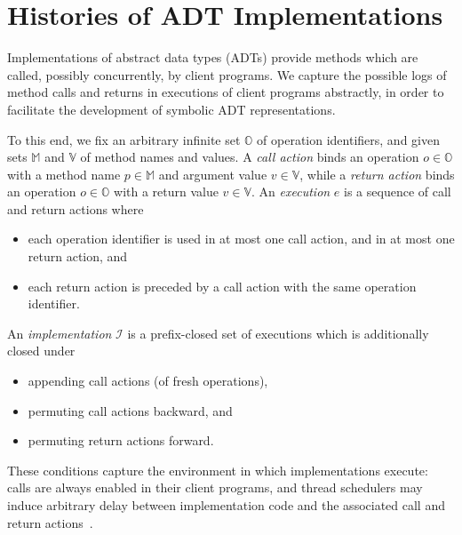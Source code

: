 \section{Histories of ADT Implementations}
\label{sec:histories}

Implementations of abstract data types (ADTs) provide methods which are called,
possibly concurrently, by client programs. We capture the possible logs of
method calls and returns in executions of client programs abstractly, in order
to facilitate the development of symbolic ADT representations.

To this end, we fix an arbitrary infinite set $\mathbb{O}$ of operation
identifiers, and given sets $\mathbb{M}$ and $\mathbb{V}$ of method names and
values. A \emph{call action} binds an operation $o \in \mathbb{O}$ with a
method name $p \in \mathbb{M}$ and argument value $v \in \mathbb{V}$, while a
\emph{return action} binds an operation $o \in \mathbb{O}$ with a return value
$v \in \mathbb{V}$. An \emph{execution} $e$ is a sequence of call and return
actions where
  \vspace{-1mm}
\begin{itemize}

  \item each operation identifier is used in at most one call action, and in at
  most one return action, and

  \item each return action is preceded by a call action with the same operation
  identifier.
  \vspace{-1mm}
\end{itemize}
An \emph{implementation} $\mathcal{I}$ is a prefix-closed set of executions
which is additionally closed under
\begin{itemize}

  \item appending call actions (of fresh operations),

  \item permuting call actions backward, and

  \item permuting return actions forward.

\end{itemize}
These conditions capture the environment in which implementations execute:
calls are always enabled in their client programs, and thread schedulers may
induce arbitrary delay between implementation code and the associated call and
return actions~\cite{conf/popl/BouajjaniEEH15}.

